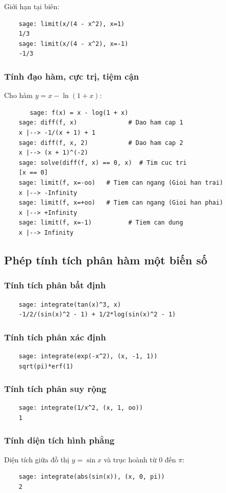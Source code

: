 Giới hạn tại biên:
\begin{lstlisting}
	sage: limit(x/(4 - x^2), x=1)
	1/3
	sage: limit(x/(4 - x^2), x=-1)
	-1/3
\end{lstlisting}

\subsubsection{Tính đạo hàm, cực trị, tiệm cận}
Cho hàm \( y = x - \ln(1 + x) \):
\begin{lstlisting}
	   sage: f(x) = x - log(1 + x)
	sage: diff(f, x)              # Dao ham cap 1
	x |--> -1/(x + 1) + 1
	sage: diff(f, x, 2)           # Dao ham cap 2
	x |--> (x + 1)^(-2)
	sage: solve(diff(f, x) == 0, x)  # Tim cuc tri
	[x == 0]
	sage: limit(f, x=-oo)	# Tiem can ngang (Gioi han trai)
	x |--> -Infinity
	sage: limit(f, x=+oo)	# Tiem can ngang (Gioi han phai)
	x |--> +Infinity
	sage: limit(f, x=-1)          # Tiem can dung
	x |--> Infinity
\end{lstlisting}

\subsection{Phép tính tích phân hàm một biến số}

\subsubsection{Tính tích phân bất định}
\begin{lstlisting}
	sage: integrate(tan(x)^3, x)
	-1/2/(sin(x)^2 - 1) + 1/2*log(sin(x)^2 - 1)
\end{lstlisting}

\subsubsection{Tính tích phân xác định}
\begin{lstlisting}
	sage: integrate(exp(-x^2), (x, -1, 1))
	sqrt(pi)*erf(1)
\end{lstlisting}

\subsubsection{Tính tích phân suy rộng}
\begin{lstlisting}
	sage: integrate(1/x^2, (x, 1, oo))
	1
\end{lstlisting}

\subsubsection{Tính diện tích hình phẳng}
Diện tích giữa đồ thị \( y = \sin{x} \) và trục hoành từ \( 0 \) đến \( \pi \):
\begin{lstlisting}
	sage: integrate(abs(sin(x)), (x, 0, pi))
	2
\end{lstlisting}

